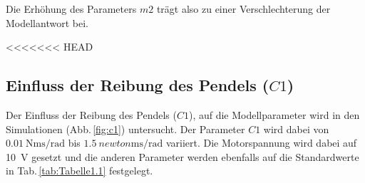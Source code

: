 Die Erhöhung des Parameters $m2$ trägt also zu einer Verschlechterung der Modellantwort bei.

<<<<<<< HEAD
\subsection*{Einfluss der Reibung des Pendels ($C1$)}
Der Einfluss der Reibung des Pendels ($C1$), auf die Modellparameter wird in den Simulationen (Abb.\,\ref{fig:c1}) untersucht. 
Der Parameter $C1$ wird dabei von $\SI{0.01}{\newton\meter\second\per\radian}$ bis $\SI{1.5}{newton\meter\second\per\radian}$ variiert.
Die Motorspannung wird dabei auf \SI{10}{\volt} gesetzt und die anderen Parameter werden ebenfalls auf die Standardwerte in Tab.\,\ref{tab:Tabelle1.1} festgelegt.\\

